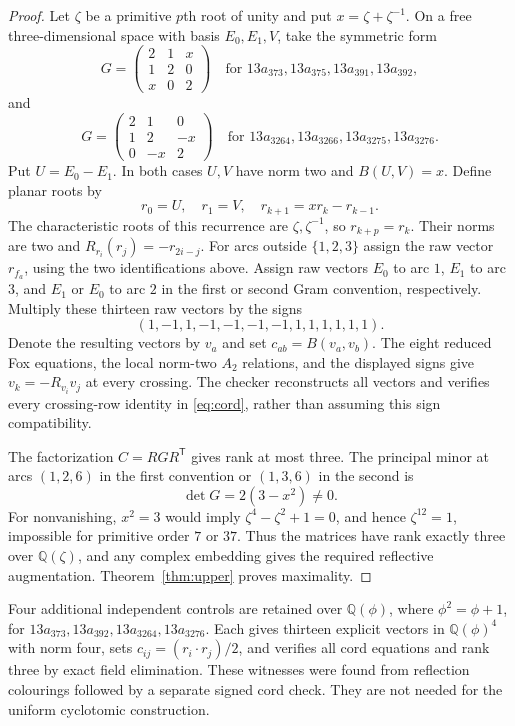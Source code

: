 \documentclass[11pt]{article}
\newcommand{\Q}{\mathbb Q}
\begin{document}
\begin{proof}
Let $\zeta$ be a primitive $p$th root of unity and put
$x=\zeta+\zeta^{-1}$. On a free three-dimensional space with basis
$E_0,E_1,V$, take the symmetric form
\[
 G=\begin{pmatrix}2&1&x\\1&2&0\\x&0&2\end{pmatrix}
 \quad\text{for }13a_{373},13a_{375},13a_{391},13a_{392},
\]
and
\[
 G=\begin{pmatrix}2&1&0\\1&2&-x\\0&-x&2\end{pmatrix}
 \quad\text{for }13a_{3264},13a_{3266},13a_{3275},13a_{3276}.
\]
Put $U=E_0-E_1$. In both cases $U,V$ have norm two and
$B(U,V)=x$. Define planar roots by
\[
                  r_0=U,\quad r_1=V,\quad
                  r_{k+1}=xr_k-r_{k-1}.
\]
The characteristic roots of this recurrence are $\zeta,\zeta^{-1}$,
so $r_{k+p}=r_k$. Their norms are two and
$R_{r_i}(r_j)=-r_{2i-j}$.
For arcs outside $\{1,2,3\}$ assign the raw vector $r_{f_a}$,
using the two identifications above. Assign raw vectors $E_0$ to
arc $1$, $E_1$ to arc $3$, and $E_1$ or $E_0$ to arc $2$ in the
first or second Gram convention, respectively.
Multiply these thirteen raw vectors by the signs
\[
                     (1,-1,1,-1,-1,-1,-1,1,1,1,1,1,1).
\]
Denote the resulting vectors by $v_a$ and set $c_{ab}=B(v_a,v_b)$.
The eight reduced Fox equations, the local norm-two $A_2$ relations,
and the displayed signs give $v_k=-R_{v_i}v_j$ at every crossing.
The checker reconstructs all vectors and verifies every crossing-row
identity in \eqref{eq:cord}, rather than assuming this sign compatibility.

The factorization $C=RGR^{\mathsf T}$ gives rank at most three.
The principal minor at arcs $(1,2,6)$ in the first convention or
$(1,3,6)$ in the second is
\[
                            \det G=2(3-x^2)\ne0.
\]
For nonvanishing, $x^2=3$ would imply
$\zeta^4-\zeta^2+1=0$, and hence $\zeta^{12}=1$, impossible for
primitive order $7$ or $37$. Thus the matrices have rank exactly
three over $\Q(\zeta)$, and any complex embedding gives the required
reflective augmentation. Theorem~\ref{thm:upper} proves maximality.
\end{proof}

Four additional independent controls are retained over
$\Q(\phi)$, where $\phi^2=\phi+1$, for
$13a_{373},13a_{392},13a_{3264},13a_{3276}$.
Each gives thirteen explicit vectors in $\Q(\phi)^4$ with norm four,
sets $c_{ij}=(r_i\cdot r_j)/2$, and verifies all cord equations and
rank three by exact field elimination. These witnesses were found
from reflection colourings followed by a separate signed cord check.
They are not needed for the uniform cyclotomic construction.
\end{document}
